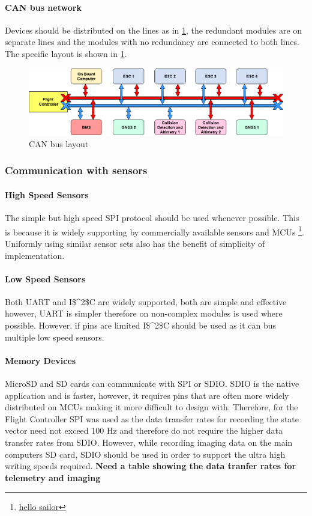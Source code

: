 \paragraph{CAN bus network}
Devices should be distributed on the lines as in \ref{fig:CAN_bus}, the redundant modules are on separate lines and the modules with no redundancy are connected to both lines. The specific layout is shown in \ref{fig:CAN_bus}.
 \begin{figure}[h!]
 \centering
  \includegraphics[width=1\textwidth]{figs/Thomas/Intra Communication/CAN bus.png}
 \caption{CAN bus layout}
 \label{fig:CAN_bus}
 \end{figure}
 
\subsubsection{Communication with sensors}
\paragraph{High Speed Sensors}
The simple but high speed \gls{SPI} protocol should be used whenever possible. This is because it is widely supporting by commercially available sensors and \gls{MCU}s \footnote{\url{hello sailor}}. Uniformly using similar sensor sets also has the benefit of simplicity of implementation.
\paragraph{Low Speed Sensors}
Both \gls{UART} and \gls{I$^2$C} are widely supported, both are simple and effective however, \gls{UART} is simpler therefore on non-complex modules is used where possible. However, if pins are limited \gls{I$^2$C} should be used as it can bus multiple low speed sensors.
\paragraph{Memory Devices}
MicroSD and SD cards can communicate with \gls{SPI} or \gls{SDIO}. \gls{SDIO} is the native application and is faster, however, it requires pins that are often more widely distributed on \gls{MCU}s making it more difficult to design with. Therefore, for the Flight Controller \gls{SPI} was used as the data transfer rates for recording the state vector need not exceed 100 Hz and therefore do not require the higher data transfer rates from \gls{SDIO}. However, while recording imaging data on the main computers SD card, \gls{SDIO} should be used in order to support the ultra high writing speeds required. \textbf{Need a table showing the data tranfer rates for telemetry and imaging}
